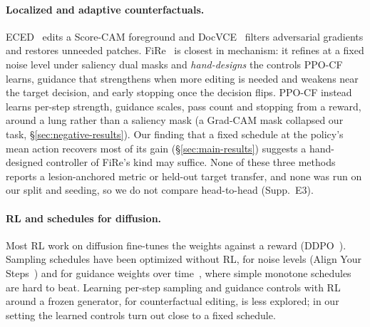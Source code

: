 \paragraph{Localized and adaptive counterfactuals.} ECED~\cite{luu2025visual} edits a Score-CAM foreground and DocVCE~\cite{saifullah2025docvce} filters adversarial gradients and restores unneeded patches. FiRe~\cite{zeng2026fire} is closest in mechanism: it refines at a fixed noise level under saliency dual masks and \emph{hand-designs} the controls PPO-CF learns, guidance that strengthens when more editing is needed and weakens near the target decision, and early stopping once the decision flips. PPO-CF instead learns per-step strength, guidance scales, pass count and stopping from a reward, around a lung rather than a saliency mask (a Grad-CAM mask collapsed our task, \S\ref{sec:negative-results}). Our finding that a fixed schedule at the policy's mean action recovers most of its gain (\S\ref{sec:main-results}) suggests a hand-designed controller of FiRe's kind may suffice. None of these three methods reports a lesion-anchored metric or held-out target transfer, and none was run on our split and seeding, so we do not compare head-to-head (Supp.~E3).

\paragraph{RL and schedules for diffusion.} Most RL work on diffusion fine-tunes the weights against a reward (\eg DDPO~\cite{black2024training}). Sampling schedules have been optimized without RL, for noise levels (Align Your Steps~\cite{sabour2024align}) and for guidance weights over time~\cite{wang2024cfgschedulers}, where simple monotone schedules are hard to beat. Learning per-step sampling and guidance controls with RL around a frozen generator, for counterfactual editing, is less explored; in our setting the learned controls turn out close to a fixed schedule.
